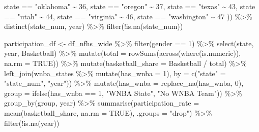 \documentclass[
  letterpaper,
  DIV=11,
  numbers=noendperiod]{scrartcl}
\newenvironment{Shaded}{\begin{snugshade}}{\end{snugshade}}
\newcommand{\AttributeTok}[1]{\textcolor[rgb]{0.40,0.45,0.13}{#1}}
\newcommand{\ConstantTok}[1]{\textcolor[rgb]{0.56,0.35,0.01}{#1}}
\newcommand{\DecValTok}[1]{\textcolor[rgb]{0.68,0.00,0.00}{#1}}
\newcommand{\FunctionTok}[1]{\textcolor[rgb]{0.28,0.35,0.67}{#1}}
\newcommand{\NormalTok}[1]{\textcolor[rgb]{0.00,0.23,0.31}{#1}}
\newcommand{\OtherTok}[1]{\textcolor[rgb]{0.00,0.23,0.31}{#1}}
\newcommand{\SpecialCharTok}[1]{\textcolor[rgb]{0.37,0.37,0.37}{#1}}
\newcommand{\StringTok}[1]{\textcolor[rgb]{0.13,0.47,0.30}{#1}}
\begin{document}
\begin{Shaded}
\begin{Highlighting}[]
\NormalTok{    state }\SpecialCharTok{==} \StringTok{"oklahoma"} \SpecialCharTok{\textasciitilde{}} \DecValTok{36}\NormalTok{,}
\NormalTok{    state }\SpecialCharTok{==} \StringTok{"oregon"} \SpecialCharTok{\textasciitilde{}} \DecValTok{37}\NormalTok{,}
\NormalTok{    state }\SpecialCharTok{==} \StringTok{"texas"} \SpecialCharTok{\textasciitilde{}} \DecValTok{43}\NormalTok{,}
\NormalTok{    state }\SpecialCharTok{==} \StringTok{"utah"} \SpecialCharTok{\textasciitilde{}} \DecValTok{44}\NormalTok{,}
\NormalTok{    state }\SpecialCharTok{==} \StringTok{"virginia"} \SpecialCharTok{\textasciitilde{}} \DecValTok{46}\NormalTok{,}
\NormalTok{    state }\SpecialCharTok{==} \StringTok{"washington"} \SpecialCharTok{\textasciitilde{}} \DecValTok{47}
\NormalTok{  )) }\SpecialCharTok{\%\textgreater{}\%}
  \FunctionTok{distinct}\NormalTok{(state\_num, year) }\SpecialCharTok{\%\textgreater{}\%}
  \FunctionTok{filter}\NormalTok{(}\SpecialCharTok{!}\FunctionTok{is.na}\NormalTok{(state\_num))}

\NormalTok{participation\_df }\OtherTok{\textless{}{-}}\NormalTok{ df\_nfhs\_wide }\SpecialCharTok{\%\textgreater{}\%}
  \FunctionTok{filter}\NormalTok{(gender }\SpecialCharTok{==} \DecValTok{1}\NormalTok{) }\SpecialCharTok{\%\textgreater{}\%}
  \FunctionTok{select}\NormalTok{(state, year, Basketball) }\SpecialCharTok{\%\textgreater{}\%}
  \FunctionTok{mutate}\NormalTok{(}\AttributeTok{total =} \FunctionTok{rowSums}\NormalTok{(}\FunctionTok{across}\NormalTok{(}\FunctionTok{where}\NormalTok{(is.numeric)), }\AttributeTok{na.rm =} \ConstantTok{TRUE}\NormalTok{)) }\SpecialCharTok{\%\textgreater{}\%}
  \FunctionTok{mutate}\NormalTok{(}\AttributeTok{basketball\_share =}\NormalTok{ Basketball }\SpecialCharTok{/}\NormalTok{ total) }\SpecialCharTok{\%\textgreater{}\%}
  \FunctionTok{left\_join}\NormalTok{(wnba\_states }\SpecialCharTok{\%\textgreater{}\%} \FunctionTok{mutate}\NormalTok{(}\AttributeTok{has\_wnba =} \DecValTok{1}\NormalTok{), }
            \AttributeTok{by =} \FunctionTok{c}\NormalTok{(}\StringTok{"state"} \OtherTok{=} \StringTok{"state\_num"}\NormalTok{, }\StringTok{"year"}\NormalTok{)) }\SpecialCharTok{\%\textgreater{}\%}
  \FunctionTok{mutate}\NormalTok{(}\AttributeTok{has\_wnba =} \FunctionTok{replace\_na}\NormalTok{(has\_wnba, }\DecValTok{0}\NormalTok{),}
         \AttributeTok{group =} \FunctionTok{ifelse}\NormalTok{(has\_wnba }\SpecialCharTok{==} \DecValTok{1}\NormalTok{, }\StringTok{"WNBA State"}\NormalTok{, }\StringTok{"No WNBA Team"}\NormalTok{)) }\SpecialCharTok{\%\textgreater{}\%}
  \FunctionTok{group\_by}\NormalTok{(group, year) }\SpecialCharTok{\%\textgreater{}\%}
  \FunctionTok{summarise}\NormalTok{(}\AttributeTok{participation\_rate =} \FunctionTok{mean}\NormalTok{(basketball\_share, }\AttributeTok{na.rm =} \ConstantTok{TRUE}\NormalTok{), }\AttributeTok{.groups =} \StringTok{"drop"}\NormalTok{) }\SpecialCharTok{\%\textgreater{}\%}
  \FunctionTok{filter}\NormalTok{(}\SpecialCharTok{!}\FunctionTok{is.na}\NormalTok{(year))}


\end{Highlighting}
\end{Shaded}
\end{document}
